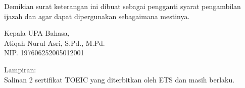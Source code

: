 \documentclass[a4paper,12pt]{article}
\begin{document}
Demikian surat keterangan ini dibuat sebagai pengganti syarat pengambilan ijazah dan agar dapat dipergunakan sebagaimana mestinya.

\vspace{2cm}

\begin{flushright}
Kepala UPA Bahasa, \\
\vspace{1cm}
Atiqah Nurul Asri, S.Pd., M.Pd. \\
NIP. 197606252005012001
\end{flushright}

Lampiran: \\
Salinan 2 sertifikat TOEIC yang diterbitkan oleh ETS dan masih berlaku.
\end{document}
